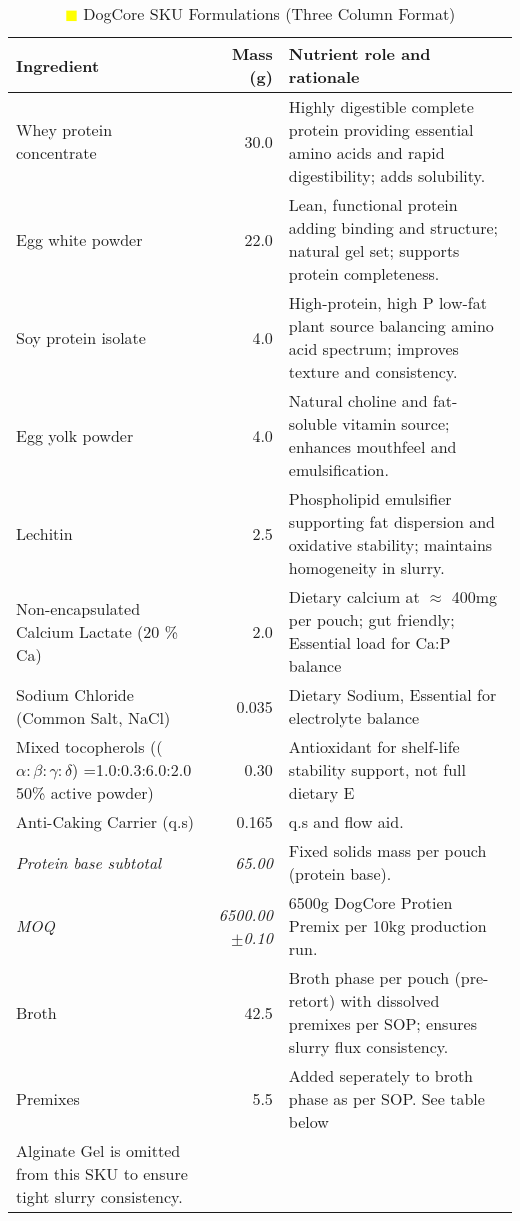 \begin{table}[h]
\centering
\begin{tabular}{@{}l r p{8.0cm}@{}}
\toprule
\textbf{Ingredient} & \textbf{Mass (g)} & \textbf{Nutrient role and rationale} \\
\midrule
Whey protein concentrate & 30.0 & Highly digestible complete protein providing essential amino acids and rapid digestibility; adds solubility. \\[3pt]
Egg white powder & 22.0 & Lean, functional protein adding binding and structure; natural gel set; supports protein completeness. \\[3pt]
Soy protein isolate & 4.0 & High-protein, high P low-fat plant source balancing amino acid spectrum; improves texture and consistency. \\[3pt]
Egg yolk powder & 4.0 & Natural choline and fat-soluble vitamin source; enhances mouthfeel and emulsification. \\[3pt]
Lechitin & 2.5 & Phospholipid emulsifier supporting fat dispersion and oxidative stability; maintains homogeneity in slurry. \\[3pt]
Non-encapsulated Calcium Lactate (20 \% Ca) & 2.0 & Dietary calcium at $\approx$ 400mg per pouch; gut friendly; Essential load for Ca:P balance \\[3pt]
Sodium Chloride (Common Salt, NaCl) & 0.035 & Dietary Sodium, Essential for electrolyte balance \\[3pt]
\midrule
Mixed tocopherols (($\alpha:\beta:\gamma:\delta$) =1.0:0.3:6.0:2.0 50\% active powder) & 0.30  & Antioxidant for shelf-life stability support, not full dietary E \\[2pt]
Anti-Caking Carrier (q.s) & 0.165 & q.s and flow aid. \\[3pt]
\midrule
\textit{Protein base subtotal} & \textit{65.00} & Fixed solids mass per pouch (protein base). \\[3pt]
\textit {MOQ} &\textit{6500.00 $\pm$0.10} & 6500g DogCore Protien Premix per 10kg production run. \\[3pt]
Broth & 42.5 & Broth phase per pouch (pre-retort) with dissolved premixes per SOP; ensures slurry flux consistency. \\[3pt]
Premixes & 5.5 & Added seperately to broth phase as per SOP. See table below \\[3pt]
Alginate Gel is omitted from this SKU to ensure tight slurry consistency. \\[3pt]
\bottomrule
\end{tabular}
\caption{\textcolor{yellow}{$\blacksquare$} DogCore SKU Formulations (Three Column Format)}
\label{tab:dogcore_sku_3col}
\end{table}

